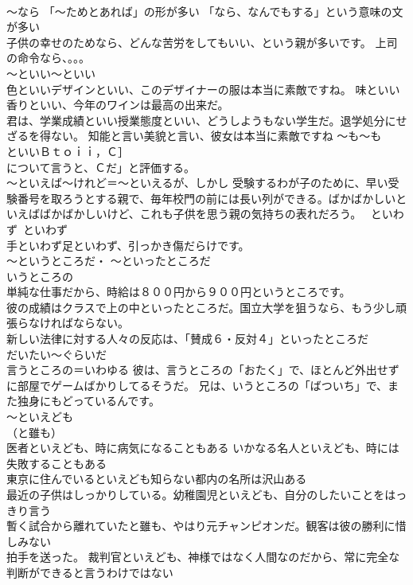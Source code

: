 \documentclass[8pt]{extreport}
\begin{document}
\begin{CJK}{UTF8}{min}
\\	～なら 「～ためとあれば」の形が多い 「なら、なんでもする」という意味の文が多い 
\\	子供の幸せのためなら、どんな苦労をしてもいい、という親が多いです。 上司の命令なら、。。。
\\	～といい～といい	
\\	色といいデザインといい、このデザイナーの服は本当に素敵ですね。 味といい香りといい、今年のワインは最高の出来だ。 
\\	君は、学業成績といい授業態度といい、どうしようもない学生だ。退学処分にせざるを得ない。 知能と言い美貌と言い、彼女は本当に素敵ですね	～も～も 
\\	といいＢｔｏｉｉ，Ｃ］
\\	について言うと、Ｃだ」と評価する。 
\\	～といえば～けれど＝～といえるが、しかし 受験するわが子のために、早い受験番号を取ろうとする親で、毎年校門の前には長い列ができる。ばかばかしいといえばばかばかしいけど、これも子供を思う親の気持ちの表れだろう。 ~といわず~といわず　
\\	手といわず足といわず、引っかき傷だらけです。
\\	～というところだ・ ～といったところだ 
\\	いうところの	
\\	単純な仕事だから、時給は８００円から９００円というところです。 
\\	彼の成績はクラスで上の中といったところだ。国立大学を狙うなら、もう少し頑張らなければならない。 
\\	新しい法律に対する人々の反応は、「賛成６・反対４」といったところだ 
\\	だいたい～ぐらいだ 
\\	言うところの＝いわゆる 彼は、言うところの「おたく」で、ほとんど外出せずに部屋でゲームばかりしてるそうだ。 兄は、いうところの「ばついち」で、また独身にもどっているんです。
\\	～といえども
\\	（と雖も）	
\\	医者といえども、時に病気になることもある いかなる名人といえども、時には失敗することもある 
\\	東京に住んでいるといえども知らない都内の名所は沢山ある 
\\	最近の子供はしっかりしている。幼稚園児といえども、自分のしたいことをはっきり言う 
\\	暫く試合から離れていたと雖も、やはり元チャンピオンだ。観客は彼の勝利に惜しみない
\\	拍手を送った。 裁判官といえども、神様ではなく人間なのだから、常に完全な判断ができると言うわけではない 

\end{CJK}
\end{document}

